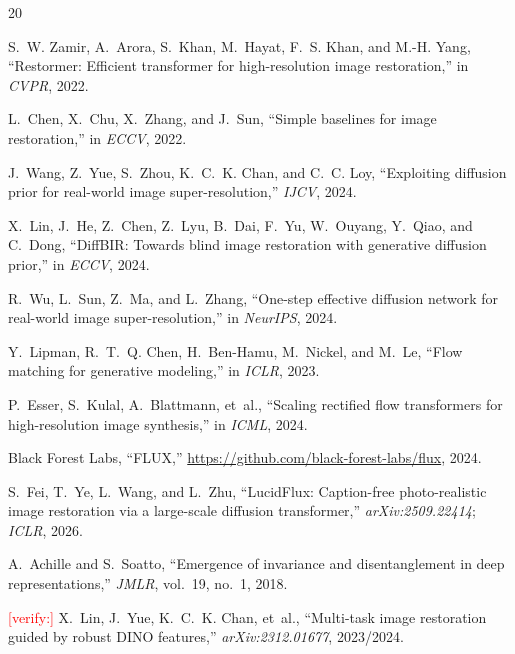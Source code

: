 \documentclass{article}
\newcommand{\authnote}[1]{\textcolor{red}{\footnotesize [#1]}}
\begin{document}
\vfill\pagebreak


\begin{thebibliography}{20}

S.~W. Zamir, A.~Arora, S.~Khan, M.~Hayat, F.~S. Khan, and M.-H. Yang,
``Restormer: Efficient transformer for high-resolution image restoration,'' in \emph{CVPR}, 2022.

L.~Chen, X.~Chu, X.~Zhang, and J.~Sun,
``Simple baselines for image restoration,'' in \emph{ECCV}, 2022.

J.~Wang, Z.~Yue, S.~Zhou, K.~C.~K. Chan, and C.~C. Loy,
``Exploiting diffusion prior for real-world image super-resolution,'' \emph{IJCV}, 2024.

X.~Lin, J.~He, Z.~Chen, Z.~Lyu, B.~Dai, F.~Yu, W.~Ouyang, Y.~Qiao, and C.~Dong,
``DiffBIR: Towards blind image restoration with generative diffusion prior,'' in \emph{ECCV}, 2024.

R.~Wu, L.~Sun, Z.~Ma, and L.~Zhang,
``One-step effective diffusion network for real-world image super-resolution,'' in \emph{NeurIPS}, 2024.

Y.~Lipman, R.~T.~Q. Chen, H.~Ben-Hamu, M.~Nickel, and M.~Le,
``Flow matching for generative modeling,'' in \emph{ICLR}, 2023.

P.~Esser, S.~Kulal, A.~Blattmann, et~al.,
``Scaling rectified flow transformers for high-resolution image synthesis,'' in \emph{ICML}, 2024.

Black Forest Labs, ``FLUX,'' \url{https://github.com/black-forest-labs/flux}, 2024.

S.~Fei, T.~Ye, L.~Wang, and L.~Zhu,
``LucidFlux: Caption-free photo-realistic image restoration via a large-scale diffusion transformer,'' \emph{arXiv:2509.22414}; \emph{ICLR}, 2026.

A.~Achille and S.~Soatto,
``Emergence of invariance and disentanglement in deep representations,'' \emph{JMLR}, vol.~19, no.~1, 2018.

\authnote{verify:} X.~Lin, J.~Yue, K.~C.~K. Chan, et~al.,
``Multi-task image restoration guided by robust DINO features,'' \emph{arXiv:2312.01677}, 2023/2024.


\end{thebibliography}
\end{document}
